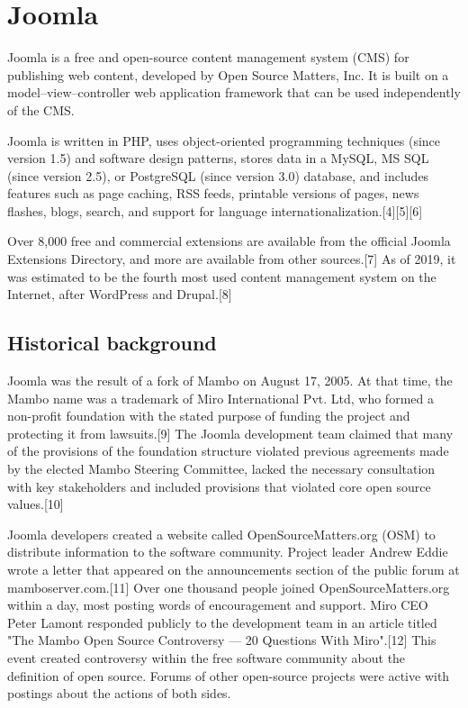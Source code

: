 \documentclass[12pt]{article}
\begin{document}
\section{Joomla}

Joomla is a free and open-source content management system (CMS) for publishing web content, developed by Open Source Matters, Inc. It is built on a model–view–controller web application framework that can be used independently of the CMS.

Joomla is written in PHP, uses object-oriented programming techniques (since version 1.5) and software design patterns, stores data in a MySQL, MS SQL (since version 2.5), or PostgreSQL (since version 3.0) database, and includes features such as page caching, RSS feeds, printable versions of pages, news flashes, blogs, search, and support for language internationalization.[4][5][6]

Over 8,000 free and commercial extensions are available from the official Joomla Extensions Directory, and more are available from other sources.[7] As of 2019, it was estimated to be the fourth most used content management system on the Internet, after WordPress and Drupal.[8] 



\subsection{Historical background}

Joomla was the result of a fork of Mambo on August 17, 2005. At that time, the Mambo name was a trademark of Miro International Pvt. Ltd, who formed a non-profit foundation with the stated purpose of funding the project and protecting it from lawsuits.[9] The Joomla development team claimed that many of the provisions of the foundation structure violated previous agreements made by the elected Mambo Steering Committee, lacked the necessary consultation with key stakeholders and included provisions that violated core open source values.[10]

Joomla developers created a website called OpenSourceMatters.org (OSM) to distribute information to the software community. Project leader Andrew Eddie wrote a letter that appeared on the announcements section of the public forum at mamboserver.com.[11] Over one thousand people joined OpenSourceMatters.org within a day, most posting words of encouragement and support. Miro CEO Peter Lamont responded publicly to the development team in an article titled "The Mambo Open Source Controversy — 20 Questions With Miro".[12] This event created controversy within the free software community about the definition of open source. Forums of other open-source projects were active with postings about the actions of both sides.
\end{document}
